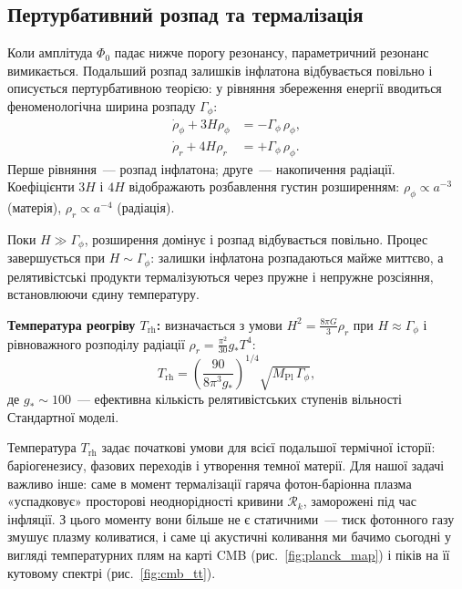 \documentclass[12pt, a4paper]{article}
\begin{document}
\subsection{Пертурбативний розпад та термалізація}

Коли амплітуда $\Phi_0$ падає нижче порогу резонансу,
параметричний резонанс вимикається. Подальший розпад
залишків інфлатона відбувається повільно і описується
пертурбативною теорією: у рівняння збереження енергії
вводиться феноменологічна ширина розпаду $\Gamma_\phi$:
\begin{align}
  \dot{\rho}_\phi + 3H\rho_\phi
    &= -\Gamma_\phi\,\rho_\phi,
    \label{eq:reheat_rho_phi} \\
  \dot{\rho}_r + 4H\rho_r
    &= +\Gamma_\phi\,\rho_\phi.
    \label{eq:reheat_rho_r}
\end{align}
Перше рівняння~--- розпад інфлатона; друге~--- накопичення
радіації. Коефіцієнти $3H$ і $4H$ відображають розбавлення
густин розширенням: $\rho_\phi \propto a^{-3}$ (матерія),
$\rho_r \propto a^{-4}$ (радіація).

Поки $H \gg \Gamma_\phi$, розширення домінує і розпад
відбувається повільно. Процес завершується при
$H \sim \Gamma_\phi$: залишки інфлатона розпадаються майже
миттєво, а релятивістські продукти термалізуються через
пружне і непружне розсіяння, встановлюючи єдину температуру.

\begin{keybox}
\textbf{Температура реогріву $T_\mathrm{rh}$:}
визначається з умови $H^2 = \frac{8\pi G}{3}\rho_r$ при
$H \approx \Gamma_\phi$ і рівноважного розподілу радіації
$\rho_r = \frac{\pi^2}{30}g_* T^4$:
\begin{equation}\label{eq:t_reheating}
  T_\mathrm{rh}
    = \left(\frac{90}{8\pi^3 g_*}\right)^{\!1/4}
      \sqrt{M_\mathrm{Pl}\,\Gamma_\phi},
\end{equation}
де $g_* \sim 100$~--- ефективна кількість
релятивістських ступенів вільності Стандартної моделі.
\end{keybox}

Температура $T_\mathrm{rh}$ задає початкові умови для
всієї подальшої термічної історії: баріогенезису, фазових
переходів і утворення темної матерії. Для нашої задачі
важливо інше: саме в момент термалізації гаряча
фотон-баріонна плазма «успадковує» просторові
неоднорідності кривини $\mathcal{R}_k$, заморожені під час
інфляції. З цього моменту вони більше не є статичними~---
тиск фотонного газу змушує плазму коливатися, і саме ці
акустичні коливання ми бачимо сьогодні у вигляді
температурних плям на карті CMB (рис.~\ref{fig:planck_map})
і піків на її кутовому спектрі (рис.~\ref{fig:cmb_tt}).
\end{document}
